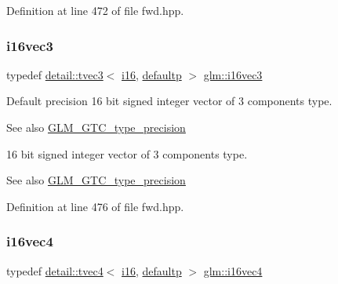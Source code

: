 Definition at line 472 of file fwd.\+hpp.

\mbox{\label{group__gtc__type__precision_ga22ec113d49837ef823048bb01511564c}} 
\subsubsection{\texorpdfstring{i16vec3}{i16vec3}}
{\footnotesize\ttfamily typedef \hyperlink{structglm_1_1detail_1_1tvec3}{detail\+::tvec3}$<$ \hyperlink{group__gtc__type__precision_ga35e5542ca05b29cc256fdafb8503d1fd}{i16}, \hyperlink{namespaceglm_a0f04f086094c747d227af4425893f545a9d21ccd8b5a009ec7eb7677befc3bf51}{defaultp} $>$ \hyperlink{group__gtc__type__precision_ga22ec113d49837ef823048bb01511564c}{glm\+::i16vec3}}

Default precision 16 bit signed integer vector of 3 components type. \begin{DoxySeeAlso}{See also}
\hyperlink{group__gtc__type__precision}{G\+L\+M\+\_\+\+G\+T\+C\+\_\+type\+\_\+precision}
\end{DoxySeeAlso}
16 bit signed integer vector of 3 components type. \begin{DoxySeeAlso}{See also}
\hyperlink{group__gtc__type__precision}{G\+L\+M\+\_\+\+G\+T\+C\+\_\+type\+\_\+precision} 
\end{DoxySeeAlso}


Definition at line 476 of file fwd.\+hpp.

\mbox{\label{group__gtc__type__precision_ga28cd96ac55e2209bdbd3a41cb8af970a}} 
\subsubsection{\texorpdfstring{i16vec4}{i16vec4}}
{\footnotesize\ttfamily typedef \hyperlink{structglm_1_1detail_1_1tvec4}{detail\+::tvec4}$<$ \hyperlink{group__gtc__type__precision_ga35e5542ca05b29cc256fdafb8503d1fd}{i16}, \hyperlink{namespaceglm_a0f04f086094c747d227af4425893f545a9d21ccd8b5a009ec7eb7677befc3bf51}{defaultp} $>$ \hyperlink{group__gtc__type__precision_ga28cd96ac55e2209bdbd3a41cb8af970a}{glm\+::i16vec4}}

